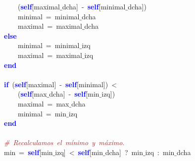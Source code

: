 \mbox{}\ \ \ \ \ \ \ \ \ \ \ \ \textcolor{BrickRed}{(}\textbf{\textcolor{Blue}{self}}\textcolor{BrickRed}{[}maximal$\_$dcha\textcolor{BrickRed}{]}\ \textcolor{BrickRed}{-}\ \textbf{\textcolor{Blue}{self}}\textcolor{BrickRed}{[}minimal$\_$dcha\textcolor{BrickRed}{])} \\
\mbox{}\ \ \ \ \ \ \ \ \ \ \ \ minimal\ \textcolor{BrickRed}{=}\ minimal$\_$dcha \\
\mbox{}\ \ \ \ \ \ \ \ \ \ \ \ maximal\ \textcolor{BrickRed}{=}\ maximal$\_$dcha \\
\mbox{}\ \ \ \ \ \ \ \ \textbf{\textcolor{Blue}{else}}\  \\
\mbox{}\ \ \ \ \ \ \ \ \ \ \ \ minimal\ \textcolor{BrickRed}{=}\ minimal$\_$izq \\
\mbox{}\ \ \ \ \ \ \ \ \ \ \ \ maximal\ \textcolor{BrickRed}{=}\ maximal$\_$izq \\
\mbox{}\ \ \ \ \ \ \ \ \textbf{\textcolor{Blue}{end}}\  \\
\mbox{} \\
\mbox{}\ \ \ \ \ \ \ \ \textbf{\textcolor{Blue}{if}}\ \textcolor{BrickRed}{(}\textbf{\textcolor{Blue}{self}}\textcolor{BrickRed}{[}maximal\textcolor{BrickRed}{]}\ \textcolor{BrickRed}{-}\ \textbf{\textcolor{Blue}{self}}\textcolor{BrickRed}{[}minimal\textcolor{BrickRed}{])}\ \textcolor{BrickRed}{\textless{}}\  \\
\mbox{}\ \ \ \ \ \ \ \ \ \ \ \ \textcolor{BrickRed}{(}\textbf{\textcolor{Blue}{self}}\textcolor{BrickRed}{[}max$\_$dcha\textcolor{BrickRed}{]}\ \textcolor{BrickRed}{-}\ \textbf{\textcolor{Blue}{self}}\textcolor{BrickRed}{[}min$\_$izq\textcolor{BrickRed}{])} \\
\mbox{}\ \ \ \ \ \ \ \ \ \ \ \ maximal\ \textcolor{BrickRed}{=}\ max$\_$dcha \\
\mbox{}\ \ \ \ \ \ \ \ \ \ \ \ minimal\ \textcolor{BrickRed}{=}\ min$\_$izq \\
\mbox{}\ \ \ \ \ \ \ \ \textbf{\textcolor{Blue}{end}} \\
\mbox{}\ \ \ \ \ \ \ \  \\
\mbox{}\ \ \ \ \ \ \ \ \textit{\textcolor{Brown}{\#\ Recalculamos\ el\ mínimo\ y\ máximo.\ \ }} \\
\mbox{}\ \ \ \ \ \ \ \ min\ \textcolor{BrickRed}{=}\ \textbf{\textcolor{Blue}{self}}\textcolor{BrickRed}{[}min$\_$izq\textcolor{BrickRed}{]}\ \textcolor{BrickRed}{\textless{}}\ \textbf{\textcolor{Blue}{self}}\textcolor{BrickRed}{[}min$\_$dcha\textcolor{BrickRed}{]}\ \textcolor{BrickRed}{?}\ min$\_$izq\ \textcolor{BrickRed}{:}\ min$\_$dcha \\

